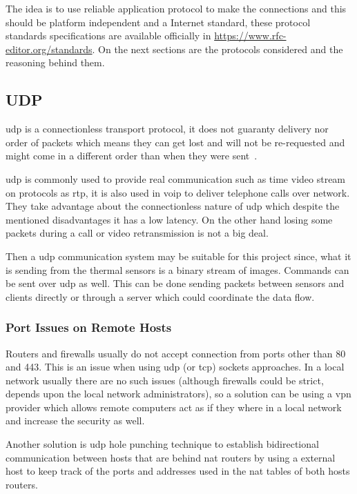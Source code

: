 \documentclass[hidelinks,11pt,a4paper,oneside,article]{memoir}
\begin{document}
The idea is to use reliable application protocol to make the connections and this should be platform independent and a Internet standard, these protocol standards specifications are available officially in \url{https://www.rfc-editor.org/standards}. On the next sections are the protocols considered and the reasoning behind them.


\subsection{UDP}
\Gls{udp} is a connectionless transport protocol, it does not guaranty delivery nor order of packets which means they can get lost and will not be re-requested and might come in a different order than when they were sent~\cite[18]{tcpip}.

\gls{udp} is commonly used to provide real communication such as time video stream on protocols as \gls{rtp}, it is also used in \gls{voip} to deliver telephone calls over network. They take advantage about the connectionless nature of \gls{udp} which despite  the mentioned disadvantages it has a low latency. On the other hand losing some packets during a call or video retransmission is not a big deal. 

Then a \gls{udp} communication system may be suitable for this project since, what it is sending from the thermal sensors is a binary stream of images. Commands can be sent over \gls{udp} as well.
This can be done sending packets between sensors and clients directly or through a server which could coordinate the data flow.

\subsubsection{Port Issues on Remote Hosts}\label{sec:port-issues-on-remote-hosts}
Routers and firewalls usually do not accept connection from ports other than 80 and 443. This is an issue when using \gls{udp} (or \gls{tcp}) sockets approaches. In a local network usually there are no such issues (although firewalls could be strict, depends upon the local network administrators), so a solution can be using a \gls{vpn} provider which allows remote computers act as if they where in a local network and increase the security as well.

Another solution is \gls{udp} hole punching technique to establish bidirectional communication between hosts that are behind \gls{nat} routers by using a external host to keep track of the ports and addresses used in the \gls{nat} tables of both hosts routers.
\end{document}
